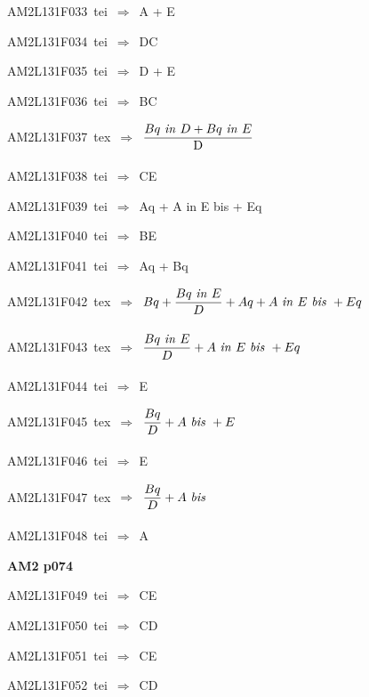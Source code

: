 {\sixrm AM2L131F033\ {\sixit tei}\ }$\Rightarrow$\ {\tenit A} + {\tenit E}\par\smallskip
{\sixrm AM2L131F034\ {\sixit tei}\ }$\Rightarrow$\ DC\par\smallskip
{\sixrm AM2L131F035\ {\sixit tei}\ }$\Rightarrow$\ {\tenit D} + {\tenit E}\par\smallskip
{\sixrm AM2L131F036\ {\sixit tei}\ }$\Rightarrow$\ BC\par\smallskip
{\sixrm AM2L131F037\ {\sixit tex}\ }$\Rightarrow$\ ${\displaystyle\strut {Bq \ {\it in}\  D + Bq \ {\it in}\  E}\over \displaystyle\strut {\rm D}}$\par\smallskip
{\sixrm AM2L131F038\ {\sixit tei}\ }$\Rightarrow$\ CE\par\smallskip
{\sixrm AM2L131F039\ {\sixit tei}\ }$\Rightarrow$\ {\tenit Aq} + {\tenit A} {\tenit in} {\tenit E} {\tenit bis} + {\tenit Eq}\par\smallskip
{\sixrm AM2L131F040\ {\sixit tei}\ }$\Rightarrow$\ BE\par\smallskip
{\sixrm AM2L131F041\ {\sixit tei}\ }$\Rightarrow$\ {\tenit Aq} + {\tenit Bq}\par\smallskip
{\sixrm AM2L131F042\ {\sixit tex}\ }$\Rightarrow$\ $Bq + {\displaystyle\strut {Bq \ {\it in}\  E}\over \displaystyle\strut D} + Aq + A \ {\it in}\  E \ {\it bis}\  + Eq$\par\smallskip
{\sixrm AM2L131F043\ {\sixit tex}\ }$\Rightarrow$\ ${\displaystyle\strut {Bq \ {\it in}\  E}\over \displaystyle\strut D} + A \ {\it in}\  E \ {\it bis}\  + Eq$\par\smallskip
{\sixrm AM2L131F044\ {\sixit tei}\ }$\Rightarrow$\ {\tenit E}\par\smallskip
{\sixrm AM2L131F045\ {\sixit tex}\ }$\Rightarrow$\ ${\displaystyle\strut Bq\over \displaystyle\strut D} + A \ {\it bis}\  + E$\par\smallskip
{\sixrm AM2L131F046\ {\sixit tei}\ }$\Rightarrow$\ {\tenit E}\par\smallskip
{\sixrm AM2L131F047\ {\sixit tex}\ }$\Rightarrow$\ ${\displaystyle\strut Bq\over \displaystyle\strut D} + A \ {\it bis}\ $\par\smallskip
{\sixrm AM2L131F048\ {\sixit tei}\ }$\Rightarrow$\ {\tenit A}\par\smallskip

\par\vfill\eject
{\bf\hfill AM2 p074\hfill\hbox{}}\par\bigskip
{\sixrm AM2L131F049\ {\sixit tei}\ }$\Rightarrow$\ CE\par\smallskip
{\sixrm AM2L131F050\ {\sixit tei}\ }$\Rightarrow$\ CD\par\smallskip
{\sixrm AM2L131F051\ {\sixit tei}\ }$\Rightarrow$\ CE\par\smallskip
{\sixrm AM2L131F052\ {\sixit tei}\ }$\Rightarrow$\ CD\par\smallskip


